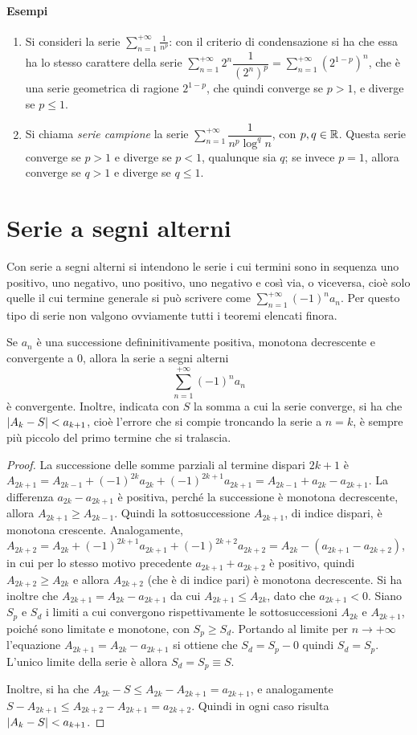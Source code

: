 \paragraph{Esempi}
\begin{enumerate}
\item Si consideri la serie $\sum_{n=1}^{+\infty}\frac1{n^p}$: con il criterio di condensazione si ha che essa ha lo stesso carattere della serie $\sum_{n=1}^{+\infty}2^n\dfrac1{(2^n)^p}=\sum_{n=1}^{+\infty}(2^{1-p})^n$, che è una serie geometrica di ragione $2^{1-p}$, che quindi converge se $p>1$, e diverge se $p\leq 1$.
\item Si chiama \emph{serie campione} la serie $\sum_{n=1}^{+\infty}\dfrac1{n^p\log^q n}$, con $p,q\in\mathbb{R}$. Questa serie converge se $p>1$ e diverge se $p<1$, qualunque sia $q$; se invece $p=1$, allora converge se $q>1$ e diverge se $q\leq 1$.
\end{enumerate}
\section{Serie a segni alterni}
Con serie a segni alterni si intendono le serie i cui termini sono in sequenza uno positivo, uno negativo, uno positivo, uno negativo e così via, o viceversa, cioè solo quelle il cui termine generale si può scrivere come $\sum_{n=1}^{+\infty}(-1)^na_n$. Per questo tipo di serie non valgono ovviamente tutti i teoremi elencati finora.
\begin{teorema}
\label{t:criterio_leibnitz}
Se $a_n$ è una successione defininitivamente positiva, monotona decrescente e convergente a 0, allora la serie a segni alterni
\[
\sum_{n=1}^{+\infty}(-1)^n a_n
\]
è convergente. Inoltre, indicata con $S$ la somma a cui la serie converge, si ha che $\left|{A_k-S}\right|<a_{k+1}$, cioè l'errore che si compie troncando la serie a $n=k$, è sempre più piccolo del primo termine che si tralascia.
\end{teorema}
\begin{proof}
La successione delle somme parziali al termine dispari $2k+1$ è $A_{2k+1}=A_{2k-1}+(-1)^{2k}a_{2k}+(-1)^{2k+1}a_{2k+1}=A_{2k-1}+a_{2k}-a_{2k+1}$. La differenza $a_{2k}-a_{2k+1}$ è positiva, perché la successione è monotona decrescente, allora $A_{2k+1}\geq A_{2k-1}$. Quindi la sottosuccessione $A_{2k+1}$, di indice dispari, è monotona crescente. Analogamente, $A_{2k+2}=A_{2k}+(-1)^{2k+1}a_{2k+1}+(-1)^{2k+2}a_{2k+2}=A_{2k}-(a_{2k+1}-a_{2k+2})$, in cui per lo stesso motivo precedente $a_{2k+1}+a_{2k+2}$ è positivo, quindi $A_{2k+2}\geq A_{2k}$ e allora $A_{2k+2}$ (che è di indice pari) è monotona decrescente.
Si ha inoltre che $A_{2k+1}=A_{2k}-a_{2k+1}$ da cui $A_{2k+1}\leq A_{2k}$, dato che $a_{2k+1}<0$. Siano $S_p$ e $S_d$ i limiti a cui convergono rispettivamente le sottosuccessioni $A_{2k}$ e $A_{2k+1}$, poiché sono limitate e monotone, con $S_p\geq S_d$. Portando al limite per $n\to+\infty$ l'equazione $A_{2k+1}=A_{2k}-a_{2k+1}$ si ottiene che $S_d=S_p-0$ quindi $S_d=S_p$. L'unico limite della serie è allora $S_d=S_p\equiv S$.

Inoltre, si ha che $A_{2k}-S\leq A_{2k}-A_{2k+1}=a_{2k+1}$, e analogamente $S-A_{2k+1}\leq A_{2k+2}-A_{2k+1}=a_{2k+2}$. Quindi in ogni caso risulta $\left|{A_k-S}\right|<a_{k+1}$.
\end{proof}

